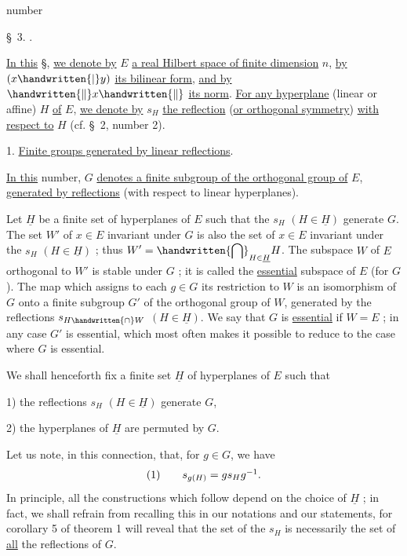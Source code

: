 \begin{flushright}number \end{flushright}
\begin{center}\S\ 3. .\end{center}

\uline{In this} \S, \uline{we denote by} $E$ \uline{a real Hilbert space of finite dimension} $n$, \uline{by} $(x\handwritten{|}y)$ \uline{its bilinear form}, \uline{and by} $\handwritten{\lVert}x\handwritten{\rVert}$ \uline{its norm}. \uline{For any hyperplane} (linear or affine) $H$ \uline{of} $E$, \uline{we denote by} $s_H$ \uline{the reflection} (\uline{or orthogonal symmetry}) \uline{with respect to} $H$ (cf. \S\ 2, number 2).

1. \uline{Finite groups generated by linear reflections}.

\uline{In this} number, $G$ \uline{denotes a finite subgroup of the orthogonal group of} $E$, \uline{generated by reflections} (with respect to linear hyperplanes).

Let $\underline{H}$ be a finite set of hyperplanes of $E$ such that the $s_H$ $(H\in\underline{H})$ generate $G$. The set $W'$ of $x\in E$ invariant under $G$ is also the set of $x\in E$ invariant under the $s_H$ $(H\in\underline{H})$ ; thus $\displaystyle W'=\handwritten{\bigcap}_{H\in\underline{H}}H$. The subspace $W$ of $E$ orthogonal to $W'$ is stable under $G$ ; it is called the \uline{essential} subspace of $E$ (for $G$). The map which assigns to each $g\in G$ its restriction to $W$ is an isomorphism of $G$ onto a finite subgroup $G'$ of the orthogonal group of $W$, generated by the reflections $s_{H\handwritten{\cap}W}$ $(H\in\underline{H})$. We say that $G$ is \uline{essential} if $W=E$ ; in any case $G'$ is essential, which most often makes it possible to reduce to the case where $G$ is essential.

We shall henceforth fix a finite set $\underline{H}$ of hyperplanes of $E$ such that

1) the reflections $s_H$ $(H\in\underline{H})$ generate $G$,

2) the hyperplanes of $\underline{H}$ are permuted by $G$.

Let us note, in this connection, that, for $g\in G$, we have
\[
\begin{array}{l@{\qquad}l}(1)&s_{g(H)}=gs_Hg^{-1}.\end{array}
\]
In principle, all the constructions which follow depend on the choice of $\underline{H}$ ; in fact, we shall refrain from recalling this in our notations and our statements, for corollary 5 of theorem 1 will reveal that the set of the $s_H$ is necessarily the set of \uline{all} the reflections of $G$.
